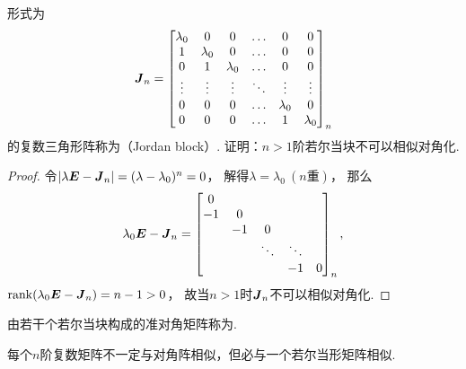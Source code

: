 \begin{example}
形式为\begin{equation*}
	\boldsymbol{J}_n = \begin{bmatrix}
		\lambda_0 & 0 & 0 & \dots & 0 & 0 \\
		1 & \lambda_0 & 0 & \dots & 0 & 0 \\
		0 & 1 & \lambda_0 & \dots & 0 & 0 \\
		\vdots & \vdots & \vdots & \ddots & \vdots & \vdots \\
		0 & 0 & 0 & \dots & \lambda_0 & 0 \\
		0 & 0 & 0 & \dots & 1 & \lambda_0
	\end{bmatrix}_n
\end{equation*}的复数三角形阵称为（Jordan block）.
证明：\(n>1\)阶若尔当块不可以相似对角化.
\begin{proof}
令\(\abs{\lambda\boldsymbol{E}-\boldsymbol{J}_n}=(\lambda-\lambda_0)^n=0\)，
解得\(\lambda=\lambda_0\ (\text{$n$重})\)，
那么\begin{equation*}
	\lambda_0\boldsymbol{E}-\boldsymbol{J}_n = \begin{bmatrix}
		0 \\
		-1 & 0 \\
		& -1 & 0 \\
		& & \ddots & \ddots \\
		& & & -1 & 0
	\end{bmatrix}_n,
\end{equation*}
\(\rank(\lambda_0\boldsymbol{E}-\boldsymbol{J}_n)=n-1 > 0\)，
故当\(n>1\)时\(\boldsymbol{J}_n\)不可以相似对角化.
\end{proof}
\end{example}

\begin{definition}
由若干个若尔当块构成的准对角矩阵称为.
\end{definition}

\begin{theorem}
每个\(n\)阶复数矩阵不一定与对角阵相似，但必与一个若尔当形矩阵相似.
\end{theorem}

